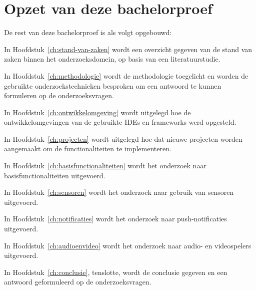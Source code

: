 \section{Opzet van deze bachelorproef}%
\label{sec:opzet-bachelorproef}


De rest van deze bachelorproef is als volgt opgebouwd:

In Hoofdstuk~\ref{ch:stand-van-zaken} wordt een overzicht gegeven van de stand van zaken binnen het onderzoeksdomein, op basis van een literatuurstudie.

In Hoofdstuk~\ref{ch:methodologie} wordt de methodologie toegelicht en worden de gebruikte onderzoekstechnieken besproken om een antwoord te kunnen formuleren op de onderzoeksvragen.

In Hoofdstuk~\ref{ch:ontwikkelomgeving} wordt uitgelegd hoe de ontwikkelomgevingen van de gebruikte IDEs en frameworks werd opgesteld.

In Hoofdstuk~\ref{ch:projecten} wordt uitgelegd hoe dat nieuwe projecten worden aangemaakt om de functionaliteiten te implementeren.

In Hoofdstuk~\ref{ch:basisfunctionaliteiten} wordt het onderzoek naar basisfunctionaliteiten uitgevoerd.

In Hoofdstuk~\ref{ch:sensoren} wordt het onderzoek naar gebruik van sensoren uitgevoerd.

In Hoofdstuk~\ref{ch:notificaties} wordt het onderzoek naar push-notificaties uitgevoerd.

In Hoofdstuk~\ref{ch:audioenvideo} wordt het onderzoek naar audio- en videospelers uitgevoerd.

In Hoofdstuk~\ref{ch:conclusie}, tenslotte, wordt de conclusie gegeven en een antwoord geformuleerd op de onderzoeksvragen.













